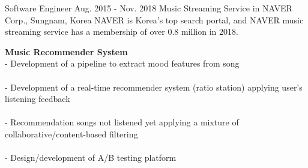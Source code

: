 \begin{cventries}
    \cventry
        {Software Engineer} %
        {Aug. 2015 - Nov. 2018} %
        {Music Streaming Service in NAVER Corp., } %
        {Sungnam, Korea}%
        { %
            NAVER is Korea's top search portal, and NAVER music streaming service has a membership of over 0.8 million in 2018.
        }
        { %
            \begin{cvitems}
                \item {
                    {\bf Music Recommender System} \\
                    - Development of a pipeline to extract mood features from song \\
                         \\
                    - Development of a real-time recommender system (ratio station) applying user's listening feedback \\
                         \\
                    - Recommendation songs not listened yet applying a mixture of collaborative/content-based filtering \\
                         \\
                    - Design/development of A/B testing platform 
                         \nn
                }
            \end{cvitems}
        }
\end{cventries}

